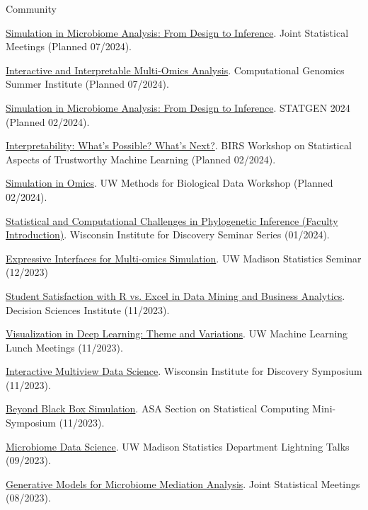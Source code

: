 \documentclass[letterpaper]{article}
\renewenvironment{itemize}{
  \begin{list}{}{
    \setlength{\leftmargin}{1.5em}
  }
}{
  \end{list}
}
\begin{document}
Community
\begin{itemize}
  \item \href{}{Simulation in Microbiome Analysis: From Design to Inference}. Joint Statistical Meetings (Planned 07/2024).
  \item \href{}{Interactive and Interpretable Multi-Omics Analysis}. Computational Genomics Summer Institute (Planned 07/2024).
  \item \href{}{Simulation in Microbiome Analysis: From Design to Inference}. STATGEN 2024 (Planned 02/2024).
  \item \href{https://krisrs1128.github.io/talks/2024/20240212/20240212.html}{Interpretability: What's Possible? What's Next?}. BIRS Workshop on Statistical Aspects of Trustworthy Machine Learning (Planned 02/2024).
  \item \href{https://github.com/krisrs1128/talks/blob/master/2024/20240207/20240207.Rmd}{Simulation in Omics}. UW Methods for Biological Data Workshop (Planned 02/2024).
  \item \href{https://krisrs1128.github.io/talks/2024/20240131/20240131.html#1}{Statistical and Computational Challenges in Phylogenetic Inference (Faculty Introduction)}. Wisconsin Institute for Discovery Seminar Series (01/2024). 
  \item \href{https://go.wisc.edu/4y9176}{Expressive Interfaces for Multi-omics Simulation}. UW Madison Statistics Seminar (12/2023)
  \item \href{https://github.com/krisrs1128/talks/blob/master/2023/20231118/dsi-kris.pptx}{Student Satisfaction with R vs. Excel in Data Mining and Business Analytics}. Decision Sciences Institute (11/2023).
  \item \href{https://go.wisc.edu/9p83o9}{Visualization in Deep Learning: Theme and Variations}. UW Machine Learning Lunch Meetings (11/2023).
  \item \href{https://go.wisc.edu/02jao8}{Interactive Multiview Data Science}. Wisconsin Institute for Discovery Symposium (11/2023).
  \item \href{https://go.wisc.edu/fg7wr4}{Beyond Black Box Simulation}. ASA Section on Statistical Computing Mini-Symposium (11/2023).
  \item \href{https://go.wisc.edu/uhka79}{Microbiome Data Science}. UW Madison Statistics Department Lightning Talks (09/2023).
  \item \href{https://drive.google.com/file/d/1lQBb665vsyILnknqMdGZMPkj-7Nhhgqw/view?usp=drive_link}{Generative Models for Microbiome Mediation Analysis}. Joint Statistical Meetings (08/2023).

\end{itemize}
\end{document}
